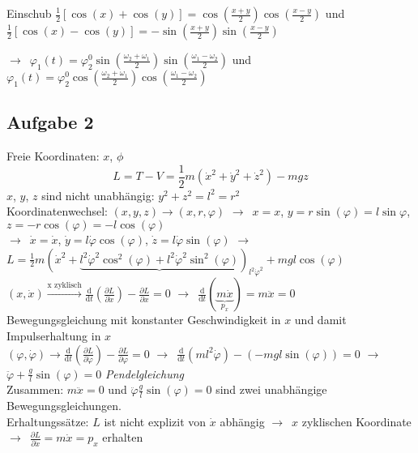 \documentclass[oneside]{book}
\theoremstyle{definition}
\newcommand{\conseq}{$\rightarrow$~}
\renewcommand{\d}{\mathrm d}
\newcommand{\dd}[1]{\frac{\d}{\d #1}}
\newcommand{\ffpartial}[2]{\frac{\partial #1}{\partial #2}}
\newcommand{\vp}{\varphi}
\newcommand{\dvp}{\dot{\vp}}
\newcommand{\ddvp}{\ddot{\vp}}
\begin{document}
Einschub
$\frac12 [\cos(x) + \cos(y)] = \cos(\frac{x + y}{2}) \cos(\frac{x-y}{2})$ und $\frac12 [\cos(x) - \cos(y)] = - \sin(\frac{x + y}{2}) \sin(\frac{x-y}{2})$

\conseq $\vp_1(t) = \vp_2^0 \sin(\frac{\omega_2 + \omega_1}{2}) \sin(\frac{\omega_1 - \omega_2}{2})$ und $\vp_1(t) = \vp_2^0 \cos(\frac{\omega_2 + \omega_1}{2}) \cos(\frac{\omega_1 - \omega_2}{2})$


\subsection{Aufgabe 2}
Freie Koordinaten: $x$, $\phi$\\
$$L = T - V = \frac12 m (\dot{x}^2 + \dot{y}^2 + \dot{z}^2) - mgz$$
$x$, $y$, $z$ sind nicht unabhängig: $y^2 + z^2 = l^2 = r^2$\\
Koordinatenwechsel: $(x,y,z) \rightarrow (x,r,\vp)$
\conseq $x = x$, $y = r \sin(\vp) = l \sin \vp$, $z = -r\cos(\vp) = -l \cos(\vp)$\\
\conseq $\dot{x} = \dot{x}$, $\dot{y} = l \dvp \cos(\vp)$, $\dot{z} = l \dvp \sin(\vp)$
\conseq $L = \frac12 m (\dot{x}^2 + \underbrace{l^2 \dvp^2 \cos^2(\vp) + l^2 \dvp^2 \sin^2(\vp)})_{l^2 \dvp^2} + mgl \cos(\vp)$\\
$(x, \dot{x}) \xrightarrow[]{\text{x zyklisch}} \dd t (\ffpartial{L}{\dot{x}}) - \ffpartial{L}{x} = 0$
\conseq $\dd t (\underbrace{m \dot{x}}_{p_x}) = m \ddot{x} = 0$\\
Bewegungsgleichung mit konstanter Geschwindigkeit in $x$ und damit Impulserhaltung in $x$\\
$(\vp, \dvp) \rightarrow \dd t (\ffpartial{L}{\dvp}) - \ffpartial{L}{\vp} = 0$ \conseq $\dd t (m l^2 \dvp) - (- mgl \sin(\vp)) = 0$ \conseq $\ddvp + \frac{g}{l} \sin(\vp) = 0$ \textit{Pendelgleichung}\\
Zusammen: $m \ddot{x} = 0$ und $\ddvp \frac{g}{l} \sin(\vp) = 0$ sind zwei unabhängige Bewegungsgleichungen.\\
Erhaltungssätze: $L$ ist nicht explizit von $\dot{x}$ abhängig \conseq $x$ zyklischen Koordinate \conseq $\ffpartial{L}{\dot{x}} = m \dot{x} = p_x$ erhalten
\end{document}
